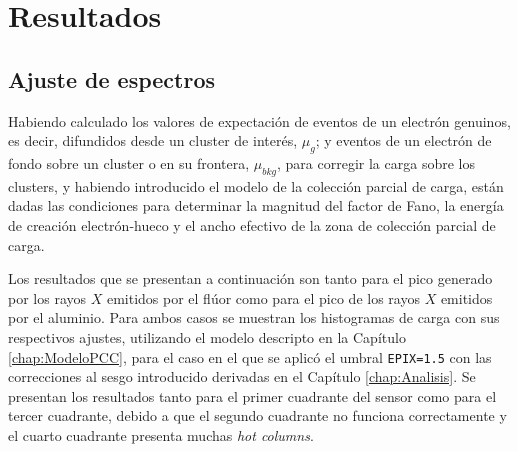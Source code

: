 \chapter{Resultados \label{chap:Resultados}}
\section{Ajuste de espectros}
\noindent Habiendo calculado los valores de expectación de eventos de un electrón genuinos, es decir, difundidos desde un cluster de interés, $\mu_{g}$; y eventos de un electrón de fondo sobre un cluster o en su frontera, $\mu_{bkg}$, para corregir la carga sobre los clusters, y habiendo introducido el modelo de la colección parcial de carga, están dadas las condiciones para determinar la magnitud del factor de Fano, la energía de creación electrón-hueco y el ancho efectivo de la zona de colección parcial de carga.

Los resultados que se presentan a continuación son tanto para el pico generado por los rayos $X$ emitidos por el flúor como para el pico de los rayos $X$ emitidos por el aluminio. Para ambos casos se muestran los histogramas de carga con sus respectivos ajustes, utilizando el modelo descripto en la Capítulo \ref{chap:ModeloPCC}, para el caso en el que se aplicó el umbral \verb|EPIX=1.5| con las correcciones al sesgo introducido derivadas en el Capítulo \ref{chap:Analisis}. 
Se presentan los resultados tanto para el primer cuadrante del sensor como para el tercer cuadrante, debido a que el segundo cuadrante no funciona correctamente y el cuarto cuadrante presenta muchas \textit{hot columns}.

